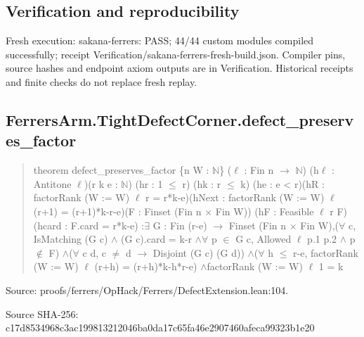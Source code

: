 \documentclass[11pt,a4paper]{article}
\begin{document}
\subsection{Verification and reproducibility}
Fresh execution: sakana-ferrers: PASS; 44/44 custom modules compiled successfully; receipt Verification/sakana-ferrers-fresh-build.json. Compiler pins, source hashes and endpoint axiom outputs are in Verification. Historical receipts and finite checks do not replace fresh replay.

\begin{samepage}
\subsection{FerrersArm.TightDefectCorner.defect\_preserves\_factor}
\begin{quote}\small\ttfamily theorem defect\_preserves\_factor \{n W : \ensuremath{\mathbb{N}}\} (\ensuremath{\ell} : Fin n \ensuremath{\to} \ensuremath{\mathbb{N}}) (h\ensuremath{\ell} : Antitone \ensuremath{\ell})\newline     (r k e : \ensuremath{\mathbb{N}}) (hr : 1 \ensuremath{\leq} r) (hk : r \ensuremath{\leq} k) (he : e < r)\newline     (hR : factorRank (W := W) \ensuremath{\ell} r = r*k-e)\newline     (hNext : factorRank (W := W) \ensuremath{\ell} (r+1) = (r+1)*k-r-e)\newline     (F : Finset (Fin n \ensuremath{\times} Fin W)) (hF : Feasible \ensuremath{\ell} r F) (hcard : F.card = r*k-e) :\newline     \ensuremath{\exists} G : Fin (r-e) \ensuremath{\to} Finset (Fin n \ensuremath{\times} Fin W),\newline       (\ensuremath{\forall} c, IsMatching (G c) \ensuremath{\wedge} (G c).card = k-r \ensuremath{\wedge}\newline         \ensuremath{\forall} p \ensuremath{\in} G c, Allowed \ensuremath{\ell} p.1 p.2 \ensuremath{\wedge} p \ensuremath{\notin} F) \ensuremath{\wedge}\newline       (\ensuremath{\forall} c d, c \ensuremath{\neq} d \ensuremath{\to} Disjoint (G c) (G d)) \ensuremath{\wedge}\newline       (\ensuremath{\forall} h \ensuremath{\leq} r-e, factorRank (W := W) \ensuremath{\ell} (r+h) = (r+h)*k-h*r-e) \ensuremath{\wedge}\newline       factorRank (W := W) \ensuremath{\ell} 1 = k\end{quote}
{\small Source: proofs/ferrers/OpHack/Ferrers/DefectExtension.lean:104.\par}

{\small Source SHA-256: c17d8534968c3ac199813212046ba0da17c65fa46e2907460afeca99323b1e20\par}

\end{samepage}
\end{document}
